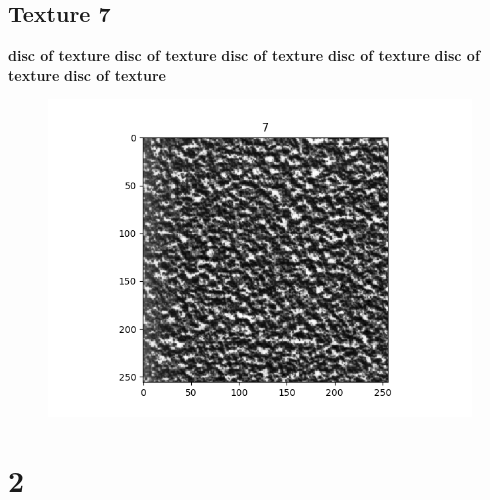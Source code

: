 \documentclass{article}
\begin{document}
\newpage

\subsection{Texture 7}
\textbf{disc of texture}
\textbf{disc of texture}
\textbf{disc of texture}
\textbf{disc of texture}
\textbf{disc of texture}
\textbf{disc of texture}
\begin{figure}[h!]
\includegraphics[scale=0.5]{7.png}
\end{figure}

\section{2}
\end{document}
